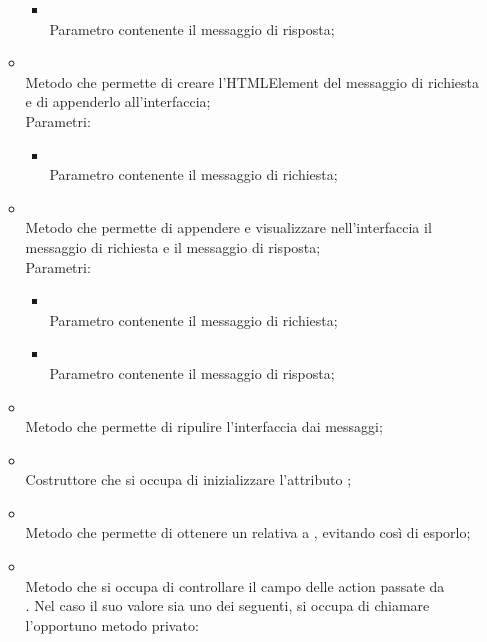 \begin{itemize}
\begin{itemize}
\begin{itemize}
			\item {} \\
			Parametro contenente il messaggio di risposta;
		\end{itemize}
		\item[]  \\		Metodo che permette di creare l'HTMLElement del messaggio di richiesta e di appenderlo all'interfaccia;\\
		Parametri:
		\begin{itemize}
			\item {} \\
			Parametro contenente il messaggio di richiesta;
		\end{itemize}
		\item[]  \\		Metodo che permette di appendere e visualizzare nell'interfaccia il messaggio di richiesta e il messaggio di risposta;\\
		Parametri:
		\begin{itemize}
			\item {} \\
			Parametro contenente il messaggio di richiesta;
			\item {} \\
			Parametro contenente il messaggio di risposta;
		\end{itemize}
		\item[]  \\		Metodo che permette di ripulire l'interfaccia dai messaggi;\\
		\item[]  \\		Costruttore che si occupa di inizializzare l'attributo ;\\
		\item[]  \\		Metodo che permette di ottenere un  relativa a , evitando così di esporlo;\\
		\item[]  \\		Metodo che si occupa di controllare il campo  delle action passate da \\ . Nel caso il suo valore sia uno dei seguenti, si occupa di chiamare l'opportuno metodo privato:

\end{itemize}
\end{itemize}
